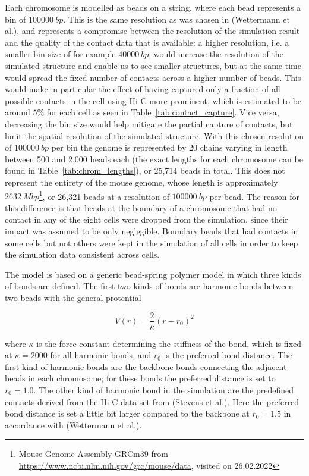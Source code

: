 Each chromosome is modelled as beads on a string, where each bead represents a bin of \(\SI{100000}{bp}\). This is the same resolution as was chosen in (Wettermann et al.\cite{wettermann_minimal_2020}), and represents a compromise between the resolution of the simulation result and the quality of the contact data that is available: a higher resolution, i.e. a smaller bin size of for example \(\SI{40000}{bp}\), would increase the resolution of the simulated structure and enable us to see smaller structures, but at the same time would spread the fixed number of contacts across a higher number of beads. This would make in particular the effect of having captured only a fraction of all possible contacts in the cell using Hi-C more prominent, which is estimated to be around \(5\%\) for each cell as seen in Table~\ref{tab:contact_capture}. Vice versa, decreasing the bin size would help mitigate the partial capture of contacts, but limit the spatial resolution of the simulated structure. With this chosen resolution of \(\SI{100000}{bp}\) per bin the genome is represented by 20 chains varying in length between 500 and 2,000 beads each (the exact lengths for each chromosome can be found in Table~\ref{tab:chrom_lengths}), or 25,714 beads in total. This does not represent the entirety of the mouse genome, whose length is approximately \(\SI{2632}{Mbp}\)\footnote{Mouse Genome Assembly GRCm39 from \url{https://www.ncbi.nlm.nih.gov/grc/mouse/data}, visited on 26.02.2022}, or 26,321 beads at a resolution of \(\SI{100000}{bp}\) per bead. The reason for this difference is that beads at the boundary of a chromosome that had no contact in any of the eight cells were dropped from the simulation, since their impact was assumed to be only neglegible. Boundary beads that had contacts in some cells but not others were kept in the simulation of all cells in order to keep the simulation data consistent across cells.

The model is based on a generic bead-spring polymer model in which three kinds of bonds are defined. The first two kinds of bonds are harmonic bonds between two beads with the general protential

\[
  V(r) = \frac{2} \kappa \left( r - r_0 \right)^2
\]

where \(\kappa\) is the force constant determining the stiffness of the bond, which is fixed at \(\kappa = 2000\) for all harmonic bonds, and \(r_0\) is the preferred bond distance. The first kind of harmonic bonds are the backbone bonds connecting the adjacent beads in each chromosome; for these bonds the preferred distance is set to \(r_0 = 1.0 \). The other kind of harmonic bond in the simulation are the predefined contacts derived from the Hi-C data set from (Stevens et al.\cite{stevens_3d_2017}). Here the preferred bond distance is set a little bit larger compared to the backbone at \(r_0 = 1.5\) in accordance with (Wettermann et al.\cite{wettermann_minimal_2020}).

